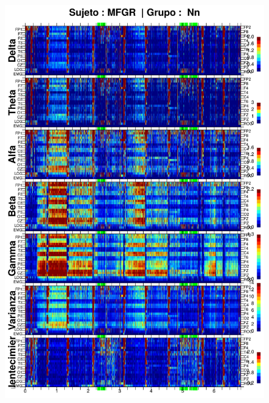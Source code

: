 \begin{figure}
\centering
\includegraphics[width=0.9\linewidth]
{./enlentecimiento/GURM251148SUE_espectral_total.png} 
\end{figure}
